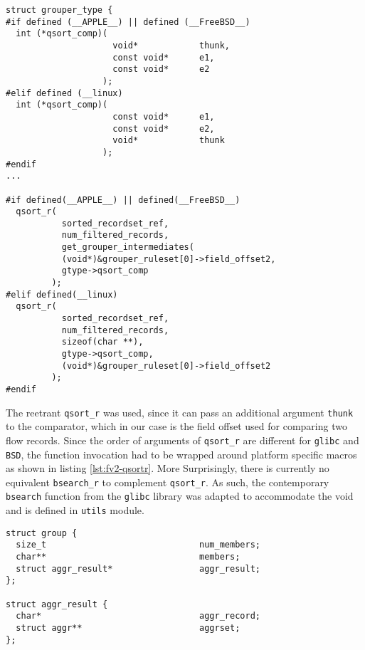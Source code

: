 \begin{lstlisting}
struct grouper_type {
#if defined (__APPLE__) || defined (__FreeBSD__)
  int (*qsort_comp)(
                     void*            thunk,
                     const void*      e1,
                     const void*      e2
                   );
#elif defined (__linux)
  int (*qsort_comp)(
                     const void*      e1,
                     const void*      e2,
                     void*            thunk
                   );
#endif
...

#if defined(__APPLE__) || defined(__FreeBSD__)
  qsort_r(
           sorted_recordset_ref,
           num_filtered_records,
           get_grouper_intermediates(
           (void*)&grouper_ruleset[0]->field_offset2,
           gtype->qsort_comp
         );
#elif defined(__linux)
  qsort_r(
           sorted_recordset_ref,
           num_filtered_records,
           sizeof(char **),
           gtype->qsort_comp,
           (void*)&grouper_ruleset[0]->field_offset2
         );
#endif
\end{lstlisting}

The reetrant \texttt{qsort\_r} was used, since it can pass an additional
argument \texttt{thunk} to the comparator, which in our case is the field
offset used for comparing two flow records. Since the order of arguments of
\texttt{qsort\_r} are 
different for \texttt{glibc} and \texttt{BSD}, the function invocation had to
be wrapped around platform specific macros as shown in listing
\ref{lst:fv2-qsortr}. More Surprisingly, there is currently no equivalent
\texttt{bsearch\_r} to complement \texttt{qsort\_r}. As such, the contemporary
\texttt{bsearch} function from the \texttt{glibc} library was adapted to
accommodate the void and is defined in \texttt{utils} module.

\begin{lstlisting}
struct group {
  size_t                              num_members;
  char**                              members;
  struct aggr_result*                 aggr_result;
};

struct aggr_result {
  char*                               aggr_record;
  struct aggr**                       aggrset;
};

\end{lstlisting}

